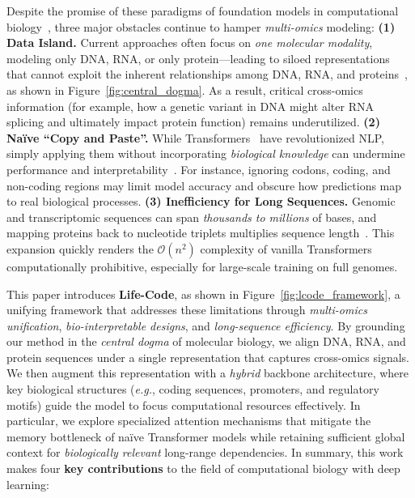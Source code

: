 Despite the promise of these paradigms of foundation models in computational biology~\cite{lin2023esm,nguyen2024evo,shen2024rnafm}, three major obstacles continue to hamper \textit{multi-omics} modeling:
% 
\textbf{(1) Data Island.} Current approaches often focus on \textit{one molecular modality}, modeling only DNA, RNA, or only protein---leading to siloed representations that cannot exploit the inherent relationships among DNA, RNA, and proteins~\cite{hong2022crossomics}, as shown in Figure~\ref{fig:central_dogma}. As a result, critical cross-omics information (for example, how a genetic variant in DNA might alter RNA splicing and ultimately impact protein function) remains underutilized.
% 
\textbf{(2) Na\"ive ``Copy and Paste''.} While Transformers~\cite{vaswani2017attention, devlin2019bert} have revolutionized NLP, simply applying them without incorporating \textit{biological knowledge} can undermine performance and interpretability~\cite{rives2021biological}. For instance, ignoring codons, coding, and non-coding regions may limit model accuracy and obscure how predictions map to real biological processes.
% 
\textbf{(3) Inefficiency for Long Sequences.} Genomic and transcriptomic sequences can span \textit{thousands to millions} of bases, and mapping proteins back to nucleotide triplets multiplies sequence length~\cite{alquraishi2019proteinnet}. This expansion quickly renders the \(\mathcal{O}(n^2)\) complexity of vanilla Transformers computationally prohibitive, especially for large-scale training on full genomes.

This paper introduces \textbf{Life-Code}, as shown in Figure~\ref{fig:lcode_framework}, a unifying framework that addresses these limitations through \textit{multi-omics unification}, \textit{bio-interpretable designs}, and \textit{long-sequence efficiency}. By grounding our method in the \textit{central dogma} of molecular biology, we align DNA, RNA, and protein sequences under a single representation that captures cross-omics signals. We then augment this representation with a \textit{hybrid} backbone architecture, where key biological structures (\textit{e.g.}, coding sequences, promoters, and regulatory motifs) guide the model to focus computational resources effectively. In particular, we explore specialized attention mechanisms that mitigate the memory bottleneck of na\"ive Transformer models while retaining sufficient global context for \textit{biologically relevant} long-range dependencies.
In summary, this work makes four \textbf{key contributions} to the field of computational biology with deep learning:

